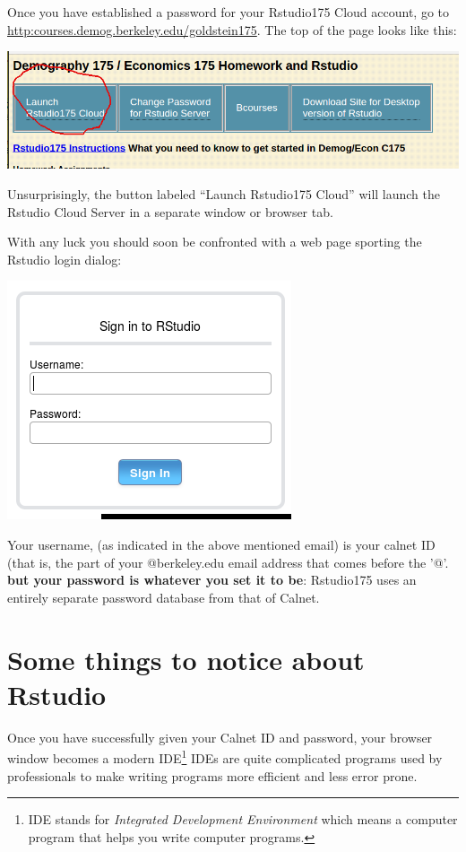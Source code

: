 \documentclass[11pt]{article}
\begin{document}
Once you have established a password for your Rstudio175 Cloud account, go to 
\url{http:courses.demog.berkeley.edu/goldstein175}.  The top of the page looks like this:

\includegraphics[scale=.5]{WebsiteTop}

Unsurprisingly, the button labeled ``Launch Rstudio175 Cloud'' will launch the Rstudio Cloud Server in a separate window or browser tab. 

\vspace{.5cm}

With any luck you should soon be confronted with a web page sporting the Rstudio login dialog:

\includegraphics[scale=.35]{RstudioSignin}

Your username, (as indicated in the above mentioned email) is your
calnet ID (that is, the part of your @berkeley.edu email address that comes before the '@'. \textbf{but your password is whatever you set it to be}:
Rstudio175 uses an entirely separate password database from that of
Calnet.

\section{Some things to notice about Rstudio}

Once you have successfully given your Calnet ID and password, your browser window becomes a modern IDE\footnote{IDE stands for \emph{Integrated Development Environment} which means a computer program that helps you write computer programs.} IDEs are quite complicated programs used by professionals to make writing programs more efficient and less error prone.
\end{document}
